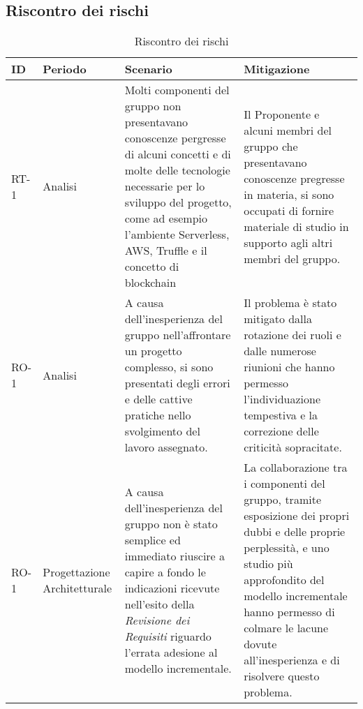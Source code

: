 \begin{appendices}
\section{Riscontro dei rischi}
	\begin{longtable}{
		>{\centering}p{}
		>{\centering}p{}
		>{\centering\arraybackslash}p{}
		>{\centering\arraybackslash}p{} }

		\caption {Riscontro dei rischi} \\

		\textbf{\color{white}ID} &
		\textbf{\color{white}Periodo} &
		\textbf{\color{white}Scenario} &
		\textbf{\color{white}Mitigazione}
		\tabularnewline
		\endhead

		RT-1
		&
		Analisi
		&
		Molti componenti del gruppo \Gruppo{} non presentavano conoscenze pergresse di alcuni concetti e di molte delle tecnologie necessarie per lo sviluppo del progetto, come ad esempio l'ambiente\ped{\textit{G}} Serverless\ped{\textit{G}}, AWS\ped{\textit{G}}, Truffle\ped{\textit{G}} e il concetto di blockchain\ped{\textit{G}}
		&
		Il Proponente\ped{\textit{G}} e alcuni membri del gruppo che presentavano conoscenze pregresse in materia, si sono occupati di fornire materiale di studio in supporto agli altri membri del gruppo.\\

		RO-1
		&
		Analisi
		&
		A causa dell'inesperienza del gruppo nell'affrontare un progetto complesso, si sono presentati degli errori e delle cattive pratiche nello svolgimento del lavoro assegnato.
		&
		Il problema è stato mitigato dalla rotazione dei ruoli e dalle numerose riunioni che hanno permesso l'individuazione tempestiva e la correzione delle criticità sopracitate.\\
\hline
		RO-1
		&
		Progettazione Architetturale
		&
		A causa dell'inesperienza del gruppo non è stato semplice ed immediato riuscire a capire a fondo le indicazioni ricevute nell'esito della \textit{Revisione dei Requisiti} riguardo l'errata adesione al modello incrementale.
		&
		La collaborazione tra i componenti del gruppo, tramite esposizione dei propri dubbi e delle proprie perplessità, e uno studio più approfondito del modello incrementale hanno permesso di colmare le lacune dovute all'inesperienza e di risolvere questo problema.\\


\end{longtable}
\end{appendices}
